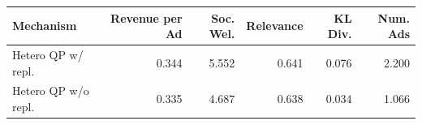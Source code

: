 \begin{tabular}{lrrrrr}
\hline
Mechanism & Revenue per Ad & Soc. Wel. & Relevance & KL Div. & Num. Ads \\
\hline
Hetero QP w/ repl. & 0.344 & 5.552 & 0.641 & 0.076 & 2.200 \\
Hetero QP w/o repl. & 0.335 & 4.687 & 0.638 & 0.034 & 1.066 \\
\hline
\end{tabular}
